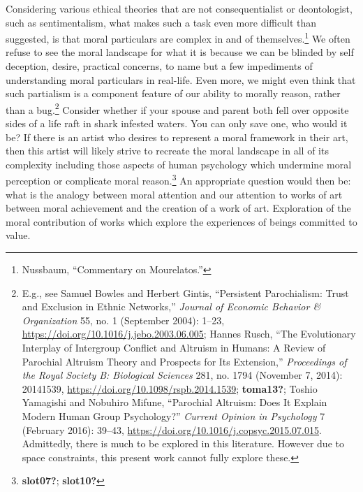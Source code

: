 \documentclass[phdthesis,12pt,final]{wuthesis}
\theoremstyle{definition}
\theoremstyle{definition}
\theoremstyle{definition}
\theoremstyle{definition}
\theoremstyle{remark}
\begin{document}
Considering various ethical theories that are not consequentialist or deontologist, such as sentimentalism, what makes such a task even more difficult than suggested, is that moral particulars are complex in and of themselves.\footnote{Nussbaum, {``Commentary on {Mourelatos}.''}} We often refuse to see the moral landscape for what it is because we can be blinded by self deception, desire, practical concerns, to name but a few impediments of understanding moral particulars in real-life. Even more, we might even think that such partialism is a component feature of our ability to morally reason, rather than a bug.\footnote{E.g., see Samuel Bowles and Herbert Gintis, {``Persistent {Parochialism}: {Trust} and Exclusion in Ethnic Networks,''} \emph{Journal of Economic Behavior \& Organization} 55, no. 1 (September 2004): 1--23, \url{https://doi.org/10.1016/j.jebo.2003.06.005}; Hannes Rusch, {``The Evolutionary Interplay of Intergroup Conflict and Altruism in Humans: A Review of Parochial Altruism Theory and Prospects for Its Extension,''} \emph{Proceedings of the Royal Society B: Biological Sciences} 281, no. 1794 (November 7, 2014): 20141539, \url{https://doi.org/10.1098/rspb.2014.1539}; \textbf{toma13?}; Toshio Yamagishi and Nobuhiro Mifune, {``Parochial {Altruism}: {Does It Explain Modern Human Group Psychology}?''} \emph{Current Opinion in Psychology} 7 (February 2016): 39--43, \url{https://doi.org/10.1016/j.copsyc.2015.07.015}. Admittedly, there is much to be explored in this literature. However due to space constraints, this present work cannot fully explore these.} Consider whether if your spouse and parent both fell over opposite sides of a life raft in shark infested waters. You can only save one, who would it be? If there is an artist who desires to represent a moral framework in their art, then this artist will likely strive to recreate the moral landscape in all of its complexity including those aspects of human psychology which undermine moral perception or complicate moral reason.\footnote{\textbf{slot07?}; \textbf{slot10?}} An appropriate question would then be: what is the analogy between moral attention and our attention to works of art between moral achievement and the creation of a work of art. Exploration of the moral contribution of works which explore the experiences of beings committed to value.
\end{document}
